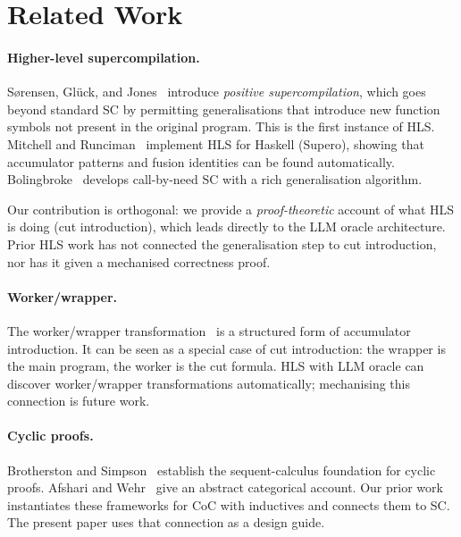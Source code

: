 \section{Related Work}
\label{sec:related}

\paragraph{Higher-level supercompilation.}
S{\o}rensen, Gl{\"u}ck, and Jones~\cite{sorensen-gluck-jones-1996-positive}
introduce \emph{positive supercompilation}, which goes beyond standard SC by
permitting generalisations that introduce new function symbols not present in
the original program.  This is the first instance of HLS.  Mitchell and
Runciman~\cite{mitchell-runciman-2010-supercompilation} implement HLS for
Haskell (Supero), showing that accumulator patterns and fusion identities can
be found automatically.  Bolingbroke~\cite{bolingbroke-2013-phd} develops
call-by-need SC with a rich generalisation algorithm.

Our contribution is orthogonal: we provide a \emph{proof-theoretic} account
of what HLS is doing (cut introduction), which leads directly to the LLM
oracle architecture.  Prior HLS work has not connected the generalisation
step to cut introduction, nor has it given a mechanised correctness proof.

\paragraph{Worker/wrapper.}
The worker/wrapper transformation~\cite{gill-hutton-2009-worker-wrapper}
is a structured form of accumulator introduction.  It can be seen as a special
case of cut introduction: the wrapper is the main program, the worker is the
cut formula.  HLS with LLM oracle can discover worker/wrapper transformations
automatically; mechanising this connection is future work.

\paragraph{Cyclic proofs.}
Brotherston and Simpson~\cite{brotherston-simpson-2011-sequent} establish
the sequent-calculus foundation for cyclic proofs.
Afshari and Wehr~\cite{afshari-wehr-2024-abstract-cyclic} give an abstract
categorical account.  Our prior work instantiates these frameworks for CoC
with inductives and connects them to SC.  The present paper uses that
connection as a design guide.

